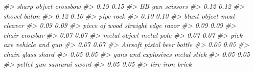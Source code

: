 \documentclass[
  12pt,
]{book}
\newenvironment{Shaded}{\begin{snugshade}}{\end{snugshade}}
\newcommand{\CommentTok}[1]{\textcolor[rgb]{0.37,0.37,0.37}{\textit{#1}}}
\begin{document}
\begin{Shaded}
\begin{Highlighting}[]
\CommentTok{\#\textgreater{}                     sharp object                         crossbow }
\CommentTok{\#\textgreater{}                             0.19                             0.15 }
\CommentTok{\#\textgreater{}                           BB gun                         scissors }
\CommentTok{\#\textgreater{}                             0.12                             0.12 }
\CommentTok{\#\textgreater{}                           shovel                            baton }
\CommentTok{\#\textgreater{}                             0.12                             0.10 }
\CommentTok{\#\textgreater{}                             pipe                             rock }
\CommentTok{\#\textgreater{}                             0.10                             0.10 }
\CommentTok{\#\textgreater{}                     blunt object                     meat cleaver }
\CommentTok{\#\textgreater{}                             0.09                             0.09 }
\CommentTok{\#\textgreater{}                    piece of wood              straight edge razor }
\CommentTok{\#\textgreater{}                             0.09                             0.09 }
\CommentTok{\#\textgreater{}                            chair                          crowbar }
\CommentTok{\#\textgreater{}                             0.07                             0.07 }
\CommentTok{\#\textgreater{}                     metal object                       metal pole }
\CommentTok{\#\textgreater{}                             0.07                             0.07 }
\CommentTok{\#\textgreater{}                         pick{-}axe                  vehicle and gun }
\CommentTok{\#\textgreater{}                             0.07                             0.07 }
\CommentTok{\#\textgreater{}                   Airsoft pistol                      beer bottle }
\CommentTok{\#\textgreater{}                             0.05                             0.05 }
\CommentTok{\#\textgreater{}                            chain                      glass shard }
\CommentTok{\#\textgreater{}                             0.05                             0.05 }
\CommentTok{\#\textgreater{}              guns and explosives                      metal stick }
\CommentTok{\#\textgreater{}                             0.05                             0.05 }
\CommentTok{\#\textgreater{}                       pellet gun                    samurai sword }
\CommentTok{\#\textgreater{}                             0.05                             0.05 }
\CommentTok{\#\textgreater{}                        tire iron                            brick }

\end{Highlighting}
\end{Shaded}
\end{document}
